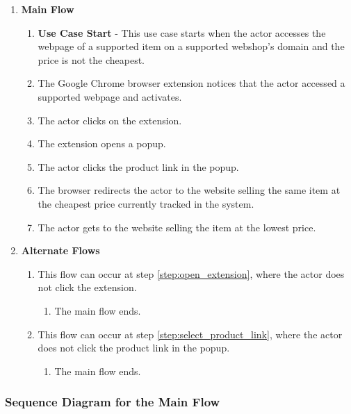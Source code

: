 \documentclass[12pt,a4paper,twoside]{report}
\begin{document}
\begin{enumerate}

  \item \textbf{Main Flow}

  \begin{enumerate}
    \item \textbf{Use Case Start} - This use case starts when the actor accesses the webpage of a supported item on a supported webshop’s domain and the price is not the cheapest.
    \item The Google Chrome browser extension notices that the actor accessed a supported webpage and activates.
    \item The actor clicks on the extension. \label{step:open_extension}
    \item The extension opens a popup.
    \item The actor clicks the product link in the popup. \label{step:select_product_link}
    \item The browser redirects the actor to the website selling the same item at the cheapest price currently tracked in the system.
    \item The actor gets to the website selling the item at the lowest price.
  \end{enumerate}


  \item \textbf{Alternate Flows}

  \begin{enumerate}
    \item This flow can occur at step \ref{step:open_extension}, where the actor does not click the extension.
    \begin{enumerate}
      \item The main flow ends.
    \end{enumerate}

    \item This flow can occur at step \ref{step:select_product_link}, where the actor does not click the product link in the popup.
    \begin{enumerate}
      \item The main flow ends.
    \end{enumerate}
  \end{enumerate}

\end{enumerate}


\subsubsection{Sequence Diagram for the Main Flow}
\end{document}
